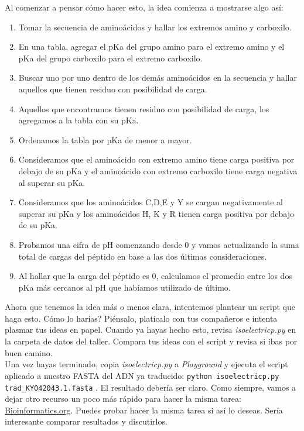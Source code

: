 \documentclass[10pt,letterpaper]{article}
\newcommand{\inlinecode}[1]{
\colorbox{light-gray}{\texttt{#1}}
}
\begin{document}
Al comenzar a pensar c\'omo hacer esto, la idea comienza a mostrarse algo as\'i:
\begin{enumerate}
\item Tomar la secuencia de amino\'acidos y hallar los extremos amino y carboxilo.
\item En una tabla, agregar el pKa del grupo amino para el extremo amino y el pKa del grupo carboxilo para el extremo carboxilo.
\item Buscar uno por uno dentro de los dem\'as amino\'acidos en la secuencia y hallar aquellos que tienen residuo con posibilidad de carga.
\item Aquellos que encontramos tienen residuo con posibilidad de carga, los agregamos a la tabla con su pKa.
\item Ordenamos la tabla por pKa de menor a mayor.
\item Consideramos que el amino\'acido con extremo amino tiene carga positiva por debajo de su pKa y el amino\'acido con extremo carboxilo tiene carga negativa al superar su pKa.
\item Consideramos que los amino\'acidos C,D,E y Y se cargan negativamente al superar su pKa y los amino\'acidos H, K y R tienen carga positiva por debajo de su pKa.
\item Probamos una cifra de pH comenzando desde 0 y vamos actualizando la suma total de cargas del p\'eptido en base a las dos \'ultimas consideraciones.
\item Al hallar que la carga del p\'eptido es 0, calculamos el promedio entre los dos pKa m\'as cercanos al pH que hab\'iamos utilizado de \'ultimo.
\end{enumerate}

Ahora que tenemos la idea m\'as o menos clara, intentemos plantear un script que haga esto. C\'omo lo har\'ias? Pi\'ensalo, plat\'icalo con tus compa\~neros e intenta plasmar tus ideas en papel. Cuando ya hayas hecho esto, revisa \textit{isoelectricp.py} en la carpeta de datos del taller. Compara tus ideas con el script y revisa si ibas por buen camino.\\

Una vez hayas terminado, copia \textit{isoelectricp.py} a \textit{Playground} y ejecuta el script aplicado a nuestro FASTA del ADN ya traducido: \inlinecode{python isoelectricp.py trad\_KY042043.1.fasta}. El resultado deber\'ia ser claro. Como siempre, vamos a dejar otro recurso un poco m\'as r\'apido para hacer la misma tarea: \href{http://bioinformatics.org/sms2/protein_iep.html}{Bioinformatics.org}. Puedes probar hacer la misma tarea si as\'i lo deseas. Ser\'ia interesante comparar resultados y discutirlos.
\end{document}
